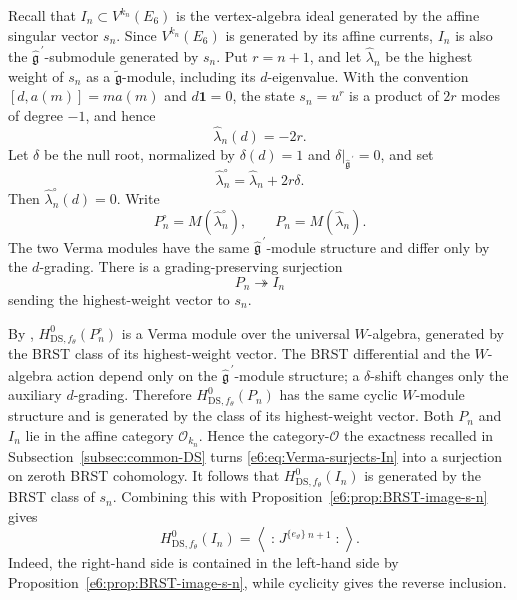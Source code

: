 \documentclass[11pt,reqno]{amsart}
\theoremstyle{definition}
\theoremstyle{remark}
\begin{document}
Recall that $I_n\subset V^{k_n}(E_6)$ is the vertex-algebra ideal
generated by the affine singular vector $s_n$.  Since $V^{k_n}(E_6)$ is
generated by its affine currents, $I_n$ is also the
$\widehat{\mathfrak g}^{\,\prime}$-submodule generated by $s_n$.
Put $r=n+1$, and let $\widehat\lambda_n$ be the highest weight of $s_n$ as a
$\widetilde{\mathfrak g}$-module, including its $d$-eigenvalue.  With the
convention $[d,a(m)]=m a(m)$ and $d\mathbf1=0$, the state $s_n=u^r$ is a product
of $2r$ modes of degree $-1$, and hence
\begin{equation*}
  \widehat\lambda_n(d)=-2r.
\end{equation*}
Let $\delta$ be the null root, normalized by $\delta(d)=1$ and
$\delta|_{\widehat{\mathfrak g}^{\,\prime}}=0$, and set
\begin{equation*}
  \widehat\lambda_n^{\circ}
  =\widehat\lambda_n+2r\delta.
\end{equation*}
Then $\widehat\lambda_n^{\circ}(d)=0$.  Write
\[
  P_n^{\circ}=M(\widehat\lambda_n^{\circ}),
  \qquad
  P_n=M(\widehat\lambda_n).
\]
The two Verma modules have the same
$\widehat{\mathfrak g}^{\,\prime}$-module structure and differ only by the
$d$-grading.  There is a grading-preserving surjection
\begin{equation}\label{e6:eq:Verma-surjects-In}
  P_n\twoheadrightarrow I_n
\end{equation}
sending the highest-weight vector to $s_n$.

By \cite[Theorem~6.3]{KacWakimoto2004},
$H^0_{\mathrm{DS},f_\theta}(P_n^{\circ})$ is a Verma module over the universal
$W$-algebra, generated by the BRST class of its highest-weight vector.  The
BRST differential and the $W$-algebra action depend only on the
$\widehat{\mathfrak g}^{\,\prime}$-module structure; a $\delta$-shift changes
only the auxiliary $d$-grading.  Therefore
$H^0_{\mathrm{DS},f_\theta}(P_n)$ has the same cyclic $W$-module structure and is
generated by the class of its highest-weight vector.  Both $P_n$ and $I_n$ lie
in the affine category $\mathcal O_{k_n}$.  Hence the category-$\mathcal O$
the exactness recalled in Subsection~\ref{subsec:common-DS} turns
\eqref{e6:eq:Verma-surjects-In} into a surjection on zeroth BRST cohomology.  It
follows that $H^0_{\mathrm{DS},f_\theta}(I_n)$ is generated by the BRST class of
$s_n$.  Combining this with Proposition~\ref{e6:prop:BRST-image-s-n} gives
\begin{equation*}
  H^0_{\mathrm{DS},f_\theta}(I_n)
  =
  \left\langle
    \mathopen{:}J^{\{e_\vartheta\}}{}^{\,n+1}\mathclose{:}
  \right\rangle.
\end{equation*}
Indeed, the right-hand side is contained in the left-hand side by
Proposition~\ref{e6:prop:BRST-image-s-n}, while cyclicity gives the reverse
inclusion.
\end{document}
